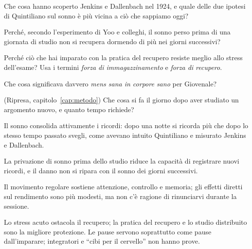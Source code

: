 \begin{domande}
  \item Che cosa hanno scoperto Jenkins e Dallenbach nel 1924, e quale
        delle due ipotesi di Quintiliano sul sonno è più vicina a ciò
        che sappiamo oggi?
  \item Perché, secondo l'esperimento di Yoo e colleghi, il sonno perso
        prima di una giornata di studio non si recupera dormendo di più
        nei giorni successivi?
  \item Perché ciò che hai imparato con la pratica del recupero resiste
        meglio allo stress dell'esame? Usa i termini \emph{forza di
        immagazzinamento} e \emph{forza di recupero}.
  \item Che cosa significava davvero \emph{mens sana in corpore sano}
        per Giovenale?
  \item (Ripresa, capitolo~\ref{cap:metodo}) Che cosa si fa il giorno
        dopo aver studiato un argomento nuovo, e quanto tempo richiede?
\end{domande}

\begin{sintesi}
  \item Il sonno consolida attivamente i ricordi: dopo una notte si
        ricorda più che dopo lo stesso tempo passato svegli, come
        avevano intuito Quintiliano e misurato Jenkins e Dallenbach.
  \item La privazione di sonno prima dello studio riduce la capacità di
        registrare nuovi ricordi, e il danno non si ripara con il
        sonno dei giorni successivi.
  \item Il movimento regolare sostiene attenzione, controllo e memoria;
        gli effetti diretti sul rendimento sono più modesti, ma non c'è
        ragione di rinunciarvi durante la sessione.
  \item Lo stress acuto ostacola il recupero; la pratica del recupero e
        lo studio distribuito sono la migliore protezione. Le pause
        servono soprattutto come pause dall'imparare; integratori e
        \enquote{cibi per il cervello} non hanno prove.
\end{sintesi}

\finecapitolo
